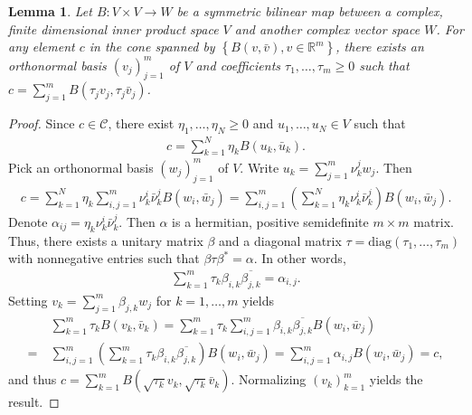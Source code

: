 \documentclass[11pt,reqno]{amsart}
\newtheorem{lemma}{Lemma}[section]
\begin{document}
\begin{lemma}
    \label{lem:abstract_cone}
    Let $B: V \times V \to W$ be a symmetric bilinear map between a complex, finite dimensional inner product space $V$ and another complex vector space $W$.
    For any element $c$ in the cone spanned by $\left\{B(v,\bar v), v \in \mathbb R^{m} \right\}$, there exists an orthonormal basis $(v_j)_{j=1}^m$ of $V$ and coefficients $\tau_1,\ldots,\tau_m \geq 0$ such that $c = \sum_{j=1}^m B(\tau_j v_j,\tau_j \bar v_j)$.
\end{lemma}

\begin{proof}
    Since $c \in \mathcal C$, there exist $\eta_1,\ldots,\eta_N \geq 0$ and $u_1,\ldots,u_N \in V$ such that
    \begin{align*}
        c = \sum_{k=1}^N \eta_k B(u_k,\bar u_k).
    \end{align*}
    Pick an orthonormal basis $(w_j)_{j=1}^m$ of $V$. Write $u_k = \sum_{j=1}^m \nu_k^j w_j$. Then 
    \begin{align*}
        c = \sum_{k=1}^N \eta_k \sum_{i,j=1}^m \nu_k^i\bar \nu_k^j B(w_i,\bar w_j) = \sum_{i,j=1}^m \left( \sum_{k=1}^N \eta_k \nu_k^i \bar \nu_k^j \right) B(w_i,\bar w_j).
    \end{align*}
    Denote $\alpha_{ij} = \eta_k \nu_k^i\bar \nu_k^j$. Then $\alpha$ is a hermitian, positive semidefinite $m \times m$ matrix. Thus, there exists a unitary matrix $\beta$ and a diagonal matrix $\tau = \mathrm{diag}(\tau_1,\ldots,\tau_m)$ with nonnegative entries such that $\beta \tau \beta^\ast = \alpha$. In other words,
    \begin{align*}
        \sum_{k=1}^m \tau_k \beta_{i,k} \overline{\beta_{j,k}} = \alpha_{i,j}.
    \end{align*}
    Setting $v_k = \sum_{j=1}^m \beta_{j,k} w_j$ for $k = 1,\ldots,m$ yields
    \begin{align*}
        &\sum_{k=1}^m \tau_k B(v_k,\bar v_k) = \sum_{k=1}^m \tau_k \sum_{i,j = 1}^m \beta_{i,k} \overline{\beta_{j,k}} B(w_i,\bar w_j) \\ = \ & \sum_{i,j = 1}^m \left( \sum_{k=1}^m \tau_k \beta_{i,k} \overline{\beta_{j,k}} \right) B(w_i,\bar w_j) = 
        \sum_{i,j = 1}^m \alpha_{i,j} B(w_i,\bar w_j) = c,
    \end{align*}
    and thus $c = \sum_{k=1}^m B(\sqrt{\tau_k} v_k,\sqrt{\tau_k} \bar v_k)$. Normalizing $(v_k)_{k=1}^m$ yields the result.
\end{proof}



\newpage



\end{document}
